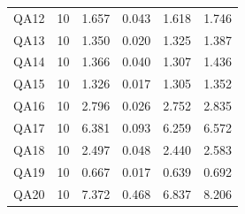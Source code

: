 \begin{table}[H]
\begin{tabular}{|c|r|r|r|r|r|}
QA12 & 10 & 1.657 & 0.043 & 1.618 & 1.746 \\
QA13 & 10 & 1.350 & 0.020 & 1.325 & 1.387 \\
QA14 & 10 & 1.366 & 0.040 & 1.307 & 1.436 \\
QA15 & 10 & 1.326 & 0.017 & 1.305 & 1.352 \\
QA16 & 10 & 2.796 & 0.026 & 2.752 & 2.835 \\
QA17 & 10 & 6.381 & 0.093 & 6.259 & 6.572 \\
QA18 & 10 & 2.497 & 0.048 & 2.440 & 2.583 \\
QA19 & 10 & 0.667 & 0.017 & 0.639 & 0.692 \\
QA20 & 10 & 7.372 & 0.468 & 6.837 & 8.206 \\
\hline
\end{tabular}
\end{table}

